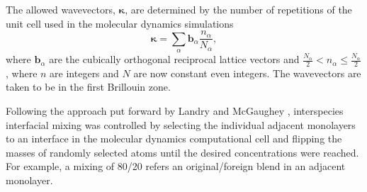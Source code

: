 \documentclass[aps,prb,preprint,preprintnumbers,amsmath,amssymb,floatfix,superscriptaddress]{revtex4}
\begin{document}
The allowed wavevectors, $\pmb{\kappa}$, are determined by the number of repetitions of the unit cell used in the molecular dynamics simulations
\begin{equation}\label{EQ:NMD:allowdkpt}
\pmb{\kappa} = \sum_{\alpha} \pmb{b}_{\alpha} \frac{n_{\alpha}}{N_{\alpha}},
\end{equation}
where $\pmb{b}_\alpha$ are the cubically orthogonal reciprocal lattice vectors and $ \frac{N_\alpha}{2} < n_\alpha \le \frac {N_\alpha}{2}$, where $n$ are integers and $N$ are now constant even integers. The wavevectors are taken to be in the first Brillouin zone.

Following the approach put forward by Landry and McGaughey \cite{PhysRevB.79.075316}, interspecies interfacial mixing was controlled by selecting the individual adjacent monolayers to an interface in the molecular dynamics computational cell and flipping the masses of randomly selected atoms until the desired concentrations were reached. For example, a mixing of 80/20 refers an original/foreign blend in an adjacent monolayer. 
\end{document}
